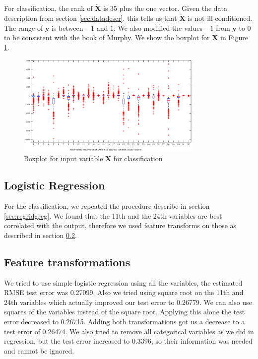 \documentclass{article} %
\begin{document}
For classification, the rank of $\mathbf{\tilde{X}}$ is 35 plus the one vector. Given the data description from section \ref{sec:datadescr}, this tells us that $\mathbf{\tilde{X}}$ is not ill-conditioned.\\ The range of $\mathbf{y}$ is between $-1$ and $1$. We also modified the values $-1$ from $\mathbf{y}$ to 0 to be consistent with the book of Murphy. We show the boxplot for $\mathbf{X}$ in Figure \ref{fig:boxplotclass}.
\begin{figure}
\centering
\includegraphics[width=0.8\textwidth]{images/boxplot_class.eps}
\caption{Boxplot for input variable $\mathbf{X}$ for classification}
\label{fig:boxplotclass}
\end{figure}
\subsection{Logistic Regression}
For the classification, we repeated the procedure describe in section \ref{sec:regridgreg}. We found that the 11th and the 24th variables are best correlated with the output, therefore we used feature transforms on those as described in section \ref{sec:ftransclass}.
\subsection{Feature transformations}
\label{sec:ftransclass}
We tried to use simple logistic regression using all the variables, the estimated RMSE test error was 0.27099. Also we tried using square root on the 11th and 24th variables which actually improved our test error to 0.26779. We can also use squares of the variables instead of the square root. Applying this alone the test error decreased to 0.26715. Adding both transformations got us a decrease to a test error of 0.26474. We also tried to remove all categorical variables as we did in regression, but the test error increased to 0.3396, so their information was needed and cannot be ignored.
\end{document}

